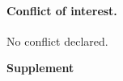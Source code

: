 \documentclass[letterpaper,11.5pt]{scrartcl}
\newcommand{\ps}[1]{{\textcolor{mygreen} {({\tiny PS:} #1)}}}
\begin{document}
\paragraph{Conflict of interest.} No conflict declared.


% 



\pagebreak
\begin{center}
  \textbf{\Large \textsf{Supplement}}
\end{center}
\setcounter{equation}{1}
\setcounter{figure}{0}
\setcounter{section}{0}
\setcounter{table}{0}
\setcounter{page}{1}
\makeatletter
\renewcommand{\theequation}{S\arabic{equation}}
\renewcommand{\thefigure}{S\arabic{figure}}
\renewcommand{\thetable}{S\arabic{table}}
\renewcommand{\thesection}{S\arabic{section}}
\renewcommand{\thepage}{S\arabic{page}}






\end{document}
